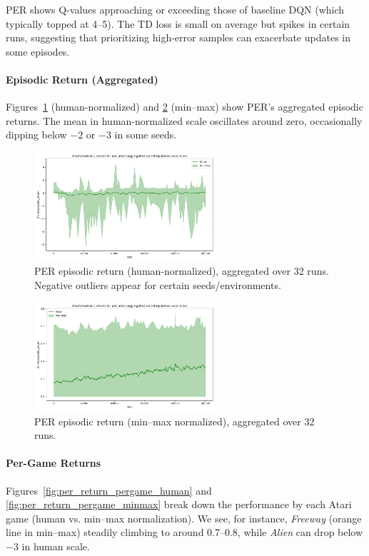 PER shows Q-values approaching or exceeding those of baseline DQN (which typically topped at 4--5). The TD loss is small on average but spikes in certain runs, suggesting that prioritizing high-error samples can exacerbate updates in some episodes.

\paragraph{Episodic Return (Aggregated)}
Figures~\ref{fig:per_return_human} (human-normalized) and \ref{fig:per_return_minmax} (min--max) show PER’s aggregated episodic returns. The mean in human-normalized scale oscillates around zero, occasionally dipping below $-2$ or $-3$ in some seeds.

\begin{figure}
	\centering
	\includegraphics[width=0.6\textwidth]{figures/per/charts_episodic_return_human_per_atari.png}
	\caption{PER episodic return (human-normalized), aggregated over 32 runs. 
		Negative outliers appear for certain seeds/environments.}
	\label{fig:per_return_human}
\end{figure}

\begin{figure}
	\centering
	\includegraphics[width=0.6\textwidth]{figures/per/charts_episodic_return_minmax_per_atari.png}
	\caption{PER episodic return (min--max normalized), aggregated over 32 runs.}
	\label{fig:per_return_minmax}
\end{figure}

\paragraph{Per-Game Returns}
Figures~\ref{fig:per_return_pergame_human} and \ref{fig:per_return_pergame_minmax} break down the performance by each Atari game (human vs. min--max normalization). We see, for instance, \emph{Freeway} (orange line in min--max) steadily climbing to around 0.7--0.8, while \emph{Alien} can drop below $-3$ in human scale. 


